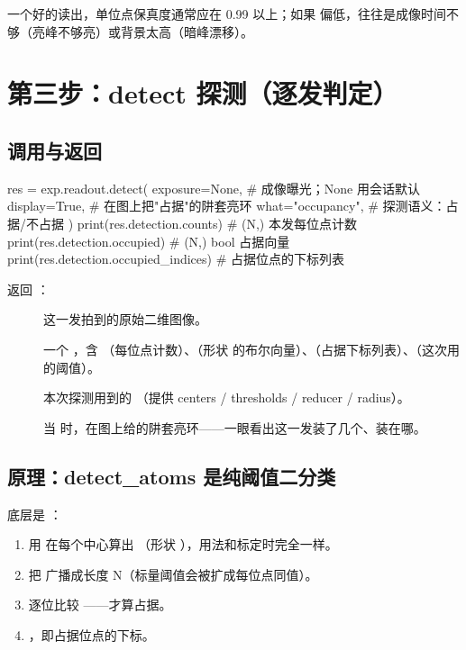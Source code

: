 \documentclass[11pt,oneside,openany]{book}
\begin{document}
一个好的读出，单位点保真度通常应在 0.99 以上；如果  偏低，往往是成像时间不够（亮峰不够亮）或背景太高（暗峰漂移）。

\section{第三步：detect 探测（逐发判定）}

\subsection{调用与返回}

\begin{codeblock}[Python]
res = exp.readout.detect(
    exposure=None,        # 成像曝光；None 用会话默认
    display=True,         # 在图上把"占据"的阱套亮环
    what="occupancy",     # 探测语义：占据/不占据
)
print(res.detection.counts)            # (N,) 本发每位点计数
print(res.detection.occupied)          # (N,) bool 占据向量
print(res.detection.occupied_indices)  # 占据位点的下标列表
\end{codeblock}

返回 ：

\begin{description}
\item[] 这一发拍到的原始二维图像。
\item[] 一个 ，含 （每位点计数）、（形状  的布尔向量）、（占据下标列表）、（这次用的阈值）。
\item[] 本次探测用到的 （提供 centers / thresholds / reducer / radius）。
\item[] 当  时，在图上给的阱套亮环——一眼看出这一发装了几个、装在哪。
\end{description}

\subsection{原理：detect\_atoms 是纯阈值二分类}

底层是 ：

\begin{enumerate}
\item 用  在每个中心算出 （形状 ），用法和标定时完全一样。
\item 把  广播成长度 N（标量阈值会被扩成每位点同值）。
\item 逐位比较 ——才算占据。
\item {}，即占据位点的下标。
\end{enumerate}
\end{document}
